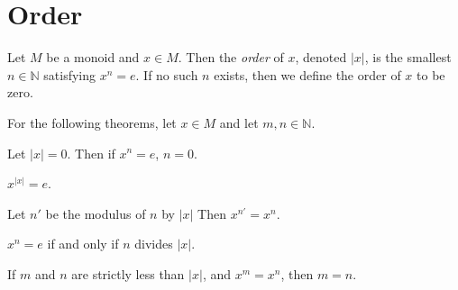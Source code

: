 \section{Order}

\begin{definition}
    \label{definition : order}
    \leanok
    Let $M$ be a monoid and $x \in M$. Then the \textit{order} of $x$, denoted $|x|$, is the smallest $n \in \mathbb{N}$ satisfying $x^n = e$. If no such $n$ exists, then we define the order of $x$ to be zero.
\end{definition}

For the following theorems, let $x \in M$ and let $m,n \in \mathbb{N}$.

\begin{theorem}
    \label{theorem : mpow_order_zero}
    \leanok
    Let $|x| = 0$. Then if $x^n = e$, $n = 0$.
\end{theorem}

\begin{theorem}
    \label{theorem : mpow_order}
    \leanok
    $x^{|x|} = e$.
\end{theorem}

\begin{theorem}
    \label{theorem : mpow_mod_order}
    \leanok
    Let $n'$ be the modulus of $n$ by $|x|$ Then $x^{n'} = x^n$.
\end{theorem}

\begin{theorem}
    \label{theorem : order_divides_iff_mpow_id}
    \leanok
    $x^n = e$ if and only if $n$ divides $|x|$.
\end{theorem}

\begin{lemma}
    \label{theorem : mpow_inj_of_lt_order}
    \leanok
    If $m$ and $n$ are strictly less than $|x|$, and $x^m = x^n$, then $m = n$.
\end{lemma}

